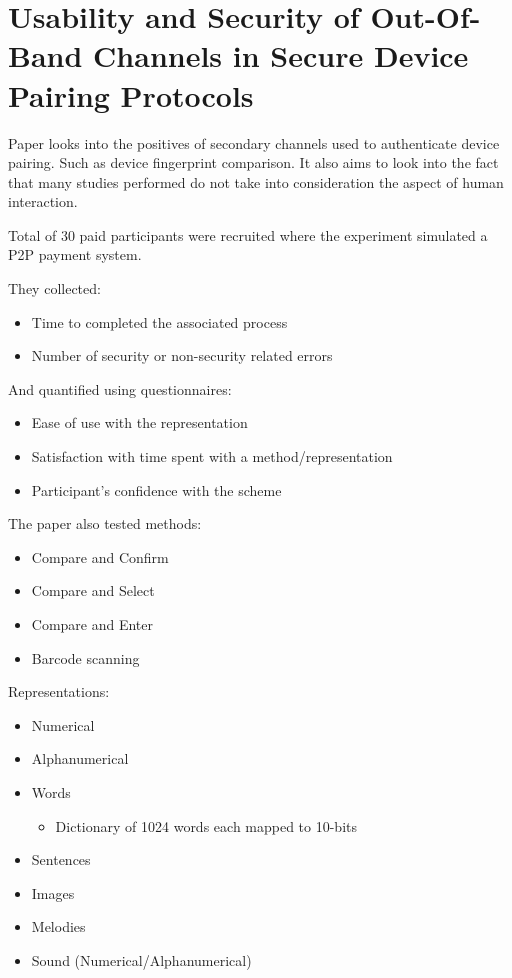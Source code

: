 \section{Usability and Security of Out-Of-Band Channels in Secure Device Pairing Protocols}

Paper looks into the positives of secondary channels used to authenticate device pairing. Such as device fingerprint comparison. It also aims to look into the fact that many studies performed do not take into consideration the aspect of human interaction.

Total of 30 paid participants were recruited where the experiment simulated a P2P payment system.

They collected:
\begin{itemize}
    \item Time to completed the associated process
    \item Number of security or non-security related errors
\end{itemize}

And quantified using questionnaires:
\begin{itemize}
    \item Ease of use with the representation
    \item Satisfaction with time spent with a method/representation
    \item Participant's confidence with the scheme
\end{itemize}

The paper also tested methods:
\begin{itemize}
    \item Compare and Confirm
    \item Compare and Select
    \item Compare and Enter
    \item Barcode scanning
\end{itemize}

Representations:
\begin{itemize}
    \item Numerical
    \item Alphanumerical
    \item Words
    \begin{itemize}
        \item Dictionary of 1024 words each mapped to 10-bits
    \end{itemize}
    \item Sentences
    \item Images
    \item Melodies
    \item Sound (Numerical/Alphanumerical)
\end{itemize}

